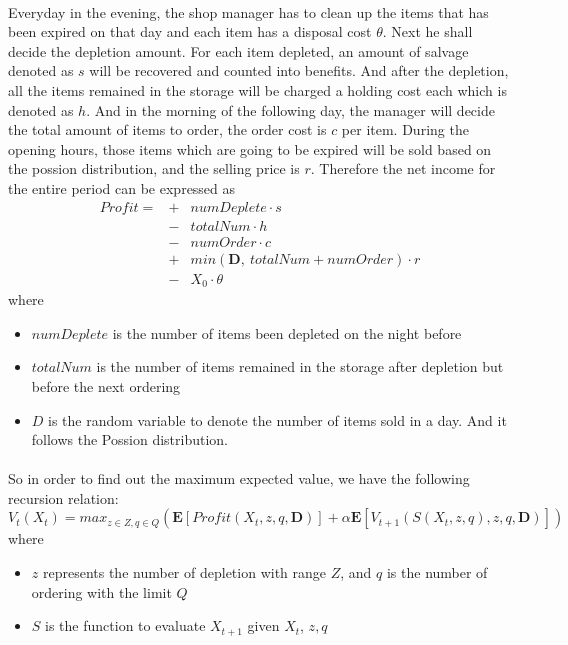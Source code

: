 \documentclass[11pt,reqno]{article}
\begin{document}
\paragraph{} Everyday in the evening, the shop manager has to clean up the items that has been expired on that day and each item has a disposal cost $\theta$. Next he shall decide the depletion amount. For each item depleted, an amount of salvage denoted as $s$ will be recovered and counted into benefits. And after the depletion, all the items remained in the storage will be charged a holding cost each which is denoted as $h$. And in the morning of the following day, the manager will decide the total amount of items to order, the order cost is $c$ per item. During the opening hours, those items which are going to be expired will be sold based on the possion distribution, and the selling price is $r$. Therefore the net income for the entire period can be expressed as 
\begin{eqnarray*}
Profit = &+&numDeplete \cdot s \\
&-& totalNum \cdot h \\
&-& numOrder \cdot c \\
&+& min(\textbf{D},~ totalNum + numOrder) \cdot r \\
&-& X_{0} \cdot \theta
\end{eqnarray*}
where 
\begin{itemize}
        \item $numDeplete$ is the number of items been depleted on the night before 
        \item $totalNum$ is the number of items remained in the storage after depletion but before the next ordering
        \item $D$ is the random variable to denote the number of items sold in a day. And it follows the Possion distribution.
\end{itemize}

\paragraph{} So in order to find out the maximum expected value, we have the following recursion relation:
$$V_{t}(X_{t}) = max_{z \in Z, q \in Q}(\textbf{E}[Profit(X_{t}, z, q, \textbf{D})] +  \alpha \textbf{E}[V_{t+1}(S(X_{t}, z, q), z, q, \textbf{D})]) $$
where 
\begin{itemize}
        \item $z$ represents the number of depletion with range $Z$, and $q$ is the number of ordering with the limit $Q$
        \item $S$ is the function to evaluate $X_{t + 1}$ given $X_{t}$, $z, q$
\end{itemize}
\end{document}
